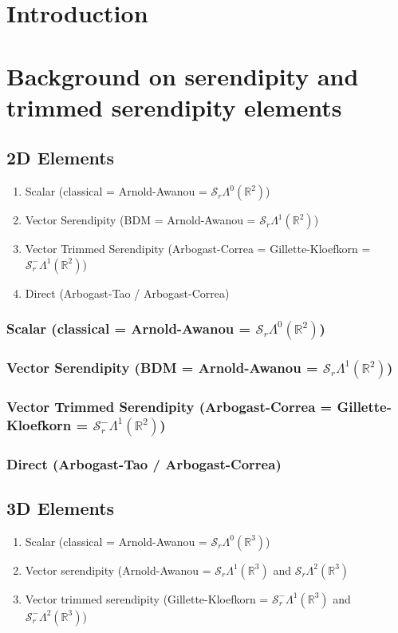 \documentclass[manuscript,screen]{acmart}
\newcommand{\R}{\mathbb{R}}
\newcommand{\calS}{\mathcal{S}}
\begin{document}
\section{Introduction}

\section{Background on serendipity and trimmed serendipity elements}

\subsection{2D Elements}
\begin{enumerate}
\item Scalar (classical = Arnold-Awanou = $\calS_r\Lambda^0(\R^2)$)
\item Vector Serendipity (BDM = Arnold-Awanou = $\calS_r\Lambda^1(\R^2)$)
\item Vector Trimmed Serendipity (Arbogast-Correa = Gillette-Kloefkorn = $\calS_r^-\Lambda^1(\R^2)$)
\item Direct (Arbogast-Tao / Arbogast-Correa)
\end{enumerate}


\subsubsection{Scalar (classical = Arnold-Awanou = $\calS_r\Lambda^0(\R^2)$)}

\subsubsection{Vector Serendipity (BDM = Arnold-Awanou = $\calS_r\Lambda^1(\R^2)$)}

\subsubsection{Vector Trimmed Serendipity (Arbogast-Correa = Gillette-Kloefkorn = $\calS_r^-\Lambda^1(\R^2)$)}

\subsubsection{Direct (Arbogast-Tao / Arbogast-Correa)}

\subsection{3D Elements}
\begin{enumerate}
\item Scalar (classical = Arnold-Awanou = $\calS_r\Lambda^0(\R^3)$)
\item Vector serendipity (Arnold-Awanou = $\calS_r\Lambda^1(\R^3)$ and $\calS_r\Lambda^2(\R^3)$
\item Vector trimmed serendipity (Gillette-Kloefkorn = $\calS_r^-\Lambda^1(\R^3)$ and $\calS_r^-\Lambda^2(\R^3)$)

\end{enumerate}
\end{document}
